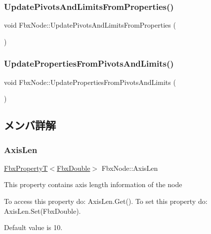 \subsubsection{\texorpdfstring{Update\+Pivots\+And\+Limits\+From\+Properties()}{UpdatePivotsAndLimitsFromProperties()}}
{\footnotesize\ttfamily void Fbx\+Node\+::\+Update\+Pivots\+And\+Limits\+From\+Properties (\begin{DoxyParamCaption}{ }\end{DoxyParamCaption})}

\mbox{\label{class_fbx_node_a8f9a4276b6237074f41006e4562ac014}} 
\subsubsection{\texorpdfstring{Update\+Properties\+From\+Pivots\+And\+Limits()}{UpdatePropertiesFromPivotsAndLimits()}}
{\footnotesize\ttfamily void Fbx\+Node\+::\+Update\+Properties\+From\+Pivots\+And\+Limits (\begin{DoxyParamCaption}{ }\end{DoxyParamCaption})}



\subsection{メンバ詳解}
\mbox{\label{class_fbx_node_a8b54074cd906df334d5d6d0cc9756223}} 
\subsubsection{\texorpdfstring{Axis\+Len}{AxisLen}}
{\footnotesize\ttfamily \hyperlink{class_fbx_property_t}{Fbx\+PropertyT}$<$\hyperlink{fbxtypes_8h_a171e72a1c46fc15c1a6c9c31948c1c5b}{Fbx\+Double}$>$ Fbx\+Node\+::\+Axis\+Len}

This property contains axis length information of the node

To access this property do\+: Axis\+Len.\+Get(). To set this property do\+: Axis\+Len.\+Set(\+Fbx\+Double).

Default value is 10. \mbox{\label{class_fbx_node_aeef58595094078471017626db0fb1f00}} 
